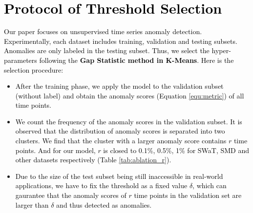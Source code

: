 \documentclass{article} %
\newcommand{\update}[1]{{\textcolor{black}{#1}}}
\begin{document}
\section{\update{Protocol of Threshold Selection}}\label{sec:threshold}

\update{Our paper focuses on unsupervised time series anomaly detection. Experimentally, each dataset includes training, validation and testing subsets. 
Anomalies are only labeled in the testing subset.  Thus, we select the hyper-parameters following the \textbf{Gap Statistic method \citep{Tibshirani2000EstimatingTN} in K-Means}. Here is the selection procedure:}
\begin{itemize}
  \item \update{After the training phase, we apply the model to the validation subset (without label) and obtain the anomaly scores (Equation \ref{equ:metric}) of all time points.}
  \item \update{We count the frequency of the anomaly scores in the validation subset. It is observed that the distribution of anomaly scores is separated into two clusters. We find that the cluster with a larger anomaly score contains $r$ time points. And for our model, $r$ is closed to 0.1\%, 0.5\%, 1\% for SWaT, SMD and other datasets respectively (Table \ref{tab:ablation_r}).}
  \item \update{Due to the size of the test subset being still inaccessible in real-world applications, we have to fix the threshold as a fixed value $\delta$, which can gaurantee that the anomaly scores of $r$ time points in the validation set are larger than $\delta$ and thus detected as anomalies.}
\end{itemize}
\end{document}
